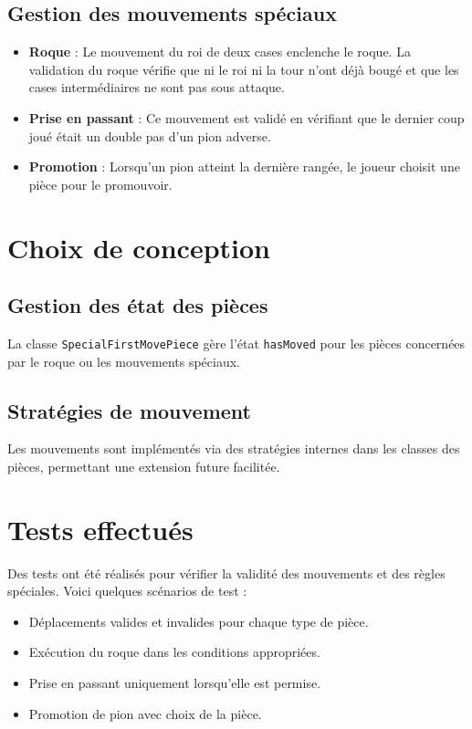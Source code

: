 \documentclass[12pt]{report}
\begin{document}
    \subsection*{Gestion des mouvements spéciaux}
    \begin{itemize}
        \item \textbf{Roque} : Le mouvement du roi de deux cases enclenche le roque. La validation du roque vérifie que ni le roi ni la tour n'ont déjà bougé et que les cases intermédiaires ne sont pas sous attaque.
        \item \textbf{Prise en passant} : Ce mouvement est validé en vérifiant que le dernier coup joué était un double pas d'un pion adverse.
        \item \textbf{Promotion} : Lorsqu'un pion atteint la dernière rangée, le joueur choisit une pièce pour le promouvoir.
    \end{itemize}



    \section*{Choix de conception}
    \subsection*{Gestion des état des pièces}
    La classe \texttt{SpecialFirstMovePiece} gère l'état \texttt{hasMoved} pour les pièces concernées par le roque ou les mouvements spéciaux.

    \subsection*{Stratégies de mouvement}
    Les mouvements sont implémentés via des stratégies internes dans les classes des pièces, permettant une extension future facilitée.


    \section*{Tests effectués}
    Des tests ont été réalisés pour vérifier la validité des mouvements et des règles spéciales. Voici quelques scénarios de test :
    \begin{itemize}
        \item Déplacements valides et invalides pour chaque type de pièce.
        \item Exécution du roque dans les conditions appropriées.
        \item Prise en passant uniquement lorsqu'elle est permise.
        \item Promotion de pion avec choix de la pièce.
    \end{itemize}
\end{document}
